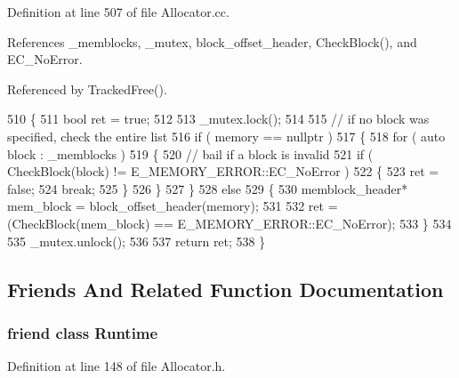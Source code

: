 Definition at line 507 of file Allocator.\-cc.



References \-\_\-memblocks, \-\_\-mutex, block\-\_\-offset\-\_\-header, Check\-Block(), and E\-C\-\_\-\-No\-Error.



Referenced by Tracked\-Free().


\begin{DoxyCode}
510 \{
511         \textcolor{keywordtype}{bool}    ret = \textcolor{keyword}{true};
512 
513         _mutex.lock();
514 
515         \textcolor{comment}{// if no block was specified, check the entire list}
516         \textcolor{keywordflow}{if} ( memory == \textcolor{keyword}{nullptr} )
517         \{
518                 \textcolor{keywordflow}{for} ( \textcolor{keyword}{auto} block : _memblocks )
519                 \{
520                         \textcolor{comment}{// bail if a block is invalid}
521                         \textcolor{keywordflow}{if} ( CheckBlock(block) != E_MEMORY_ERROR::EC_NoError )
522                         \{
523                                 ret = \textcolor{keyword}{false};
524                                 \textcolor{keywordflow}{break};
525                         \}
526                 \}
527         \}
528         \textcolor{keywordflow}{else}
529         \{
530                 memblock_header*        mem\_block = block_offset_header(memory);
531 
532                 ret = (CheckBlock(mem\_block) == E_MEMORY_ERROR::EC_NoError);
533         \}
534 
535         _mutex.unlock();
536 
537         \textcolor{keywordflow}{return} ret;
538 \}
\end{DoxyCode}


\subsection{Friends And Related Function Documentation}
\subsubsection[{Runtime}]{\setlength{\rightskip}{0pt plus 5cm}friend class {\bf Runtime}\hspace{0.3cm}{\ttfamily [friend]}}\label{class_allocator_af3d14e26ba8af9e6cc5a32aad8446de7}


Definition at line 148 of file Allocator.\-h.



